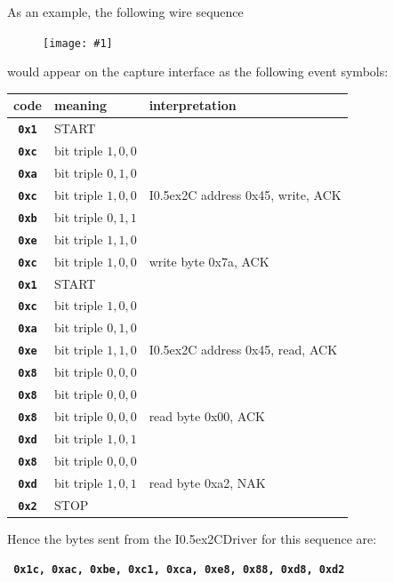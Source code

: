 \documentclass{article}
\newcommand{\two}{\raise0.5ex\hbox{\footnotesize{2}}}
\newcommand{\iic}{I\two{}C}
\newcommand{\iicdriver}{I\two{}CDriver}
\newcommand{\png}[1]{
\begin{figure}[H]
\begin{center}
\texttt{[image: \#1]}
\end{center}
\end{figure}
}
\newcommand{\mach}[1]{\texttt{\textbf{#1}}}
\newcommand{\gap}{\vspace{10pt}}
\begin{document}
\newpage
As an example, the following wire sequence

\png{img/i2cdriver/hero3}

would appear on the capture interface as the following event symbols:


\gap
\begin{center}\begin{tabular}{cll}
\hline
code & meaning & interpretation \\
\hline
  \mach{0x1}         & START \\
  \mach{0xc}         & bit triple $1,0,0$ \\
  \mach{0xa}         & bit triple $0,1,0$ \\
  \mach{0xc}         & bit triple $1,0,0$ & \iic{} address 0x45, write, ACK \\
  \mach{0xb}         & bit triple $0,1,1$ \\
  \mach{0xe}         & bit triple $1,1,0$ \\
  \mach{0xc}         & bit triple $1,0,0$ & write byte 0x7a, ACK \\
  \mach{0x1}         & START \\
  \mach{0xc}         & bit triple $1,0,0$ \\
  \mach{0xa}         & bit triple $0,1,0$ \\
  \mach{0xe}         & bit triple $1,1,0$ & \iic{} address 0x45, read, ACK \\
  \mach{0x8}         & bit triple $0,0,0$ \\
  \mach{0x8}         & bit triple $0,0,0$ \\
  \mach{0x8}         & bit triple $0,0,0$ & read byte 0x00, ACK \\
  \mach{0xd}         & bit triple $1,0,1$ \\
  \mach{0x8}         & bit triple $0,0,0$ \\
  \mach{0xd}         & bit triple $1,0,1$ & read byte 0xa2, NAK \\
  \mach{0x2}         & STOP \\
\hline
\end{tabular}\end{center}\gap

Hence the bytes sent from the \iicdriver{} for this sequence are:

\mach{ 0x1c, 0xac, 0xbe, 0xc1, 0xca, 0xe8, 0x88, 0xd8, 0xd2}

\end{document}
